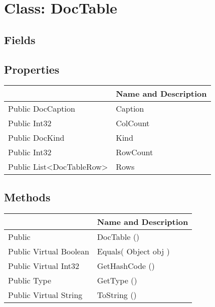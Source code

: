 \documentclass[11pt, oneside, a4paper]{book}
\begin{document}
\hypertarget{SoftwareEngineeringTools.{}Documentation.{}DocTable}{}
\section{Class: DocTable}

\subsection{Fields}

\subsection{Properties}
\begin{center}
\begin{tabular}{| p{3cm} | p{12cm} | }
\hline
\textbf{ } & \textbf{ Name and Description}\\
\hline
 Public  DocCaption &  Caption\hypertarget{SoftwareEngineeringTools.{}Documentation.{}DocTable.{}Caption}{}\\
\hline
 Public  Int32 &  ColCount\hypertarget{SoftwareEngineeringTools.{}Documentation.{}DocTable.{}ColCount}{}\\
\hline
 Public  DocKind &  Kind\hypertarget{SoftwareEngineeringTools.{}Documentation.{}DocTable.{}Kind}{}\\
\hline
 Public  Int32 &  RowCount\hypertarget{SoftwareEngineeringTools.{}Documentation.{}DocTable.{}RowCount}{}\\
\hline
 Public  List<DocTableRow> &  Rows\hypertarget{SoftwareEngineeringTools.{}Documentation.{}DocTable.{}Rows}{}\\
\hline
\end{tabular}
\end{center}

\subsection{Methods}
\begin{center}
\begin{tabular}{| p{3cm} | p{12cm} | }
\hline
\textbf{ } & \textbf{ Name and Description}\\
\hline
 Public  &  DocTable ()\hypertarget{SoftwareEngineeringTools.{}Documentation.{}DocTable.{}DocTable}{}\\
\hline
 Public  Virtual  Boolean &  Equals(\hypertarget{SoftwareEngineeringTools.{}Documentation.{}DocTable.{}Equals\_Object}{} Object  obj  )\\
\hline
 Public  Virtual  Int32 &  GetHashCode ()\hypertarget{SoftwareEngineeringTools.{}Documentation.{}DocTable.{}GetHashCode}{}\\
\hline
 Public  Type &  GetType ()\hypertarget{SoftwareEngineeringTools.{}Documentation.{}DocTable.{}GetType}{}\\
\hline
 Public  Virtual  String &  ToString ()\hypertarget{SoftwareEngineeringTools.{}Documentation.{}DocTable.{}ToString}{}\\
\hline
\end{tabular}
\end{center}
 
\end{document}
